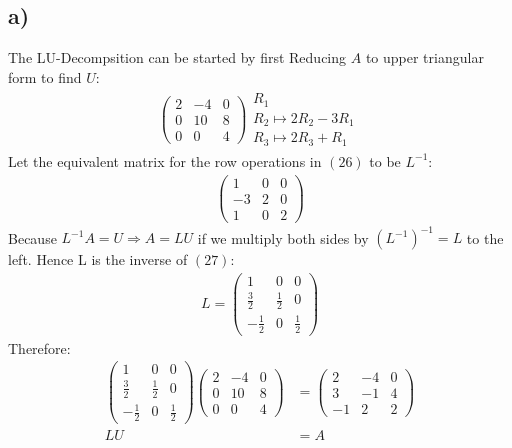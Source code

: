 \documentclass[12pt]{article}
\begin{document}
\subsection{a)}
The LU-Decompsition can be started by first Reducing $A$ to upper triangular form to find $U$:
\begin{align}
\left(\begin{array}{ccc}
2 & -4 & 0 \\
0 & 10 & 8 \\
0 & 0 & 4
\end{array}\right)
\begin{array}{l}
  \text{$R_1$}\\
  \text{$R_2 \longmapsto 2R_2 - 3R_1$}\\
  \text{$R_3 \longmapsto 2R_3 + R_1$ }
\end{array}
\end{align}
Let the equivalent matrix for the row operations in $(26)$ to be $L^{-1}$: 
\begin{align}
\left(\begin{array}{ccc}
1 & 0 & 0 \\
-3 & 2 & 0 \\
1 & 0 & 2
\end{array}\right)
\end{align}
Because $L^{-1}A=U \Rightarrow{} A=LU$ if we multiply both sides by $(L^{-1})^{-1}=L$ to the left.
Hence L is the inverse of $(27)$:
\begin{align}
L = \left(\begin{array}{ccc}
1 & 0 & 0 \\
\frac{3}{2} & \frac{1}{2} & 0 \\
-\frac{1}{2} & 0 & \frac{1}{2}
\end{array}\right)
\end{align}
Therefore:
\begin{align}
\left(\begin{array}{ccc}
1 & 0 & 0 \\
\frac{3}{2} & \frac{1}{2} & 0 \\
-\frac{1}{2} & 0 & \frac{1}{2}
\end{array}\right)
\left(\begin{array}{ccc}
2 & -4 & 0 \\
0 & 10 & 8 \\
0 & 0 & 4
\end{array}\right)
&=
\left(\begin{array}{ccc}
2 & -4 & 0 \\
3 & -1 & 4 \\
-1 & 2 & 2 
\end{array}\right) \\
LU &= A
\end{align}
\newpage
\end{document}
